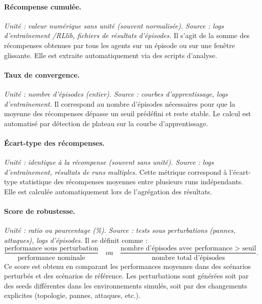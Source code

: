\paragraph{Récompense cumulée.}
\textit{Unité : valeur numérique sans unité (souvent normalisée). Source : logs d’entraînement /RLlib, fichiers de résultats d’épisodes.}
Il s’agit de la somme des récompenses obtenues par tous les agents sur un épisode ou sur une fenêtre glissante.
Elle est extraite automatiquement via des scripts d’analyse.

\paragraph{Taux de convergence.}
\textit{Unité : nombre d’épisodes (entier). Source : courbes d’apprentissage, logs d’entraînement.}
Il correspond au nombre d’épisodes nécessaires pour que la moyenne des récompenses dépasse un seuil prédéfini et reste stable.
Le calcul est automatisé par détection de plateau sur la courbe d’apprentissage.

\paragraph{Écart-type des récompenses.}
\textit{Unité : identique à la récompense (souvent sans unité). Source : logs d’entraînement, résultats de runs multiples.}
Cette métrique correspond à l’écart-type statistique des récompenses moyennes entre plusieurs runs indépendants.
Elle est calculée automatiquement lors de l’agrégation des résultats.

\paragraph{Score de robustesse.}
\textit{Unité : ratio ou pourcentage (\%). Source : tests sous perturbations (pannes, attaques), logs d’épisodes.}
Il se définit comme :
\[
    \frac{\text{performance sous perturbation}}{\text{performance nominale}}
    \quad \text{ou} \quad
    \frac{\text{nombre d’épisodes avec performance > seuil}}{\text{nombre total d’épisodes}}.
\]
Ce score est obtenu en comparant les performances moyennes dans des scénarios perturbés et des scénarios de référence.
Les perturbations sont générées soit par des seeds différentes dans les environnements simulés, soit par des changements explicites (topologie, pannes, attaques, etc.).

